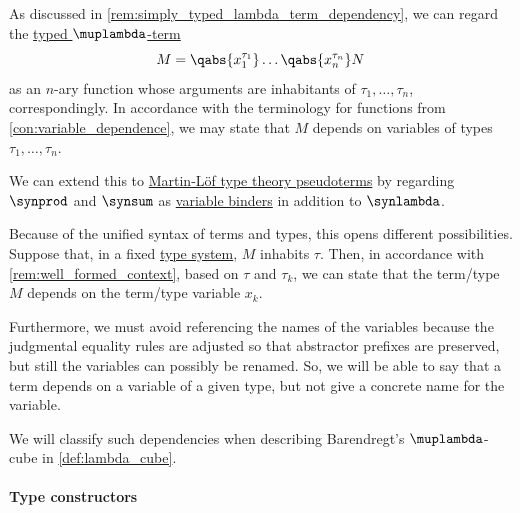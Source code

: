 \begin{remark}\label{rem:mltt_pseudoterm_dependency}
  As discussed in \cref{rem:simply_typed_lambda_term_dependency}, we can regard the \hyperref[def:typed_lambda_term]{typed \( \muplambda \)-term}
  \begin{equation*}
    M = \qabs {x_1^{\tau_1}}\ldots \qabs {x_n^{\tau_n}} N
  \end{equation*}
  as an \( n \)-ary function whose arguments are inhabitants of \( \tau_1, \ldots, \tau_n \), correspondingly. In accordance with the terminology for functions from \cref{con:variable_dependence}, we may state that \( M \) depends on variables of types \( \tau_1, \ldots, \tau_n \).

  We can extend this to \hyperref[def:mltt_pseudoterm]{Martin-L\"of type theory pseudoterms} by regarding \( \synprod \) and \( \synsum \) as \hyperref[con:variable_binding]{variable binders} in addition to \( \synlambda \).

  Because of the unified syntax of terms and types, this opens different possibilities. Suppose that, in a fixed \hyperref[def:abstract_type_system]{type system}, \( M \) inhabits \( \tau \). Then, in accordance with \cref{rem:well_formed_context}, based on \( \tau \) and \( \tau_k \), we can state that the term/type \( M \) depends on the term/type variable \( x_k \).

  Furthermore, we must avoid referencing the names of the variables because the judgmental equality rules are adjusted so that abstractor prefixes are preserved, but still the variables can possibly be renamed. So, we will be able to say that a term depends on a variable of a given type, but not give a concrete name for the variable.

  We will classify such dependencies when describing Barendregt's \( \muplambda \)-cube in \cref{def:lambda_cube}.
\end{remark}

\paragraph{Type constructors}

